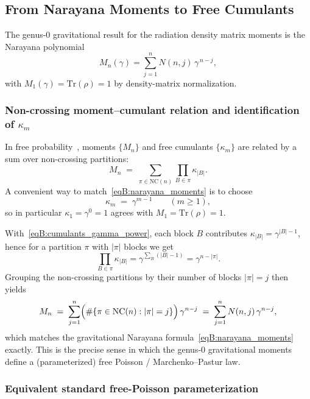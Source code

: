 \documentclass[11pt,letterpaper]{article}
\theoremstyle{plain}
\theoremstyle{definition}
\theoremstyle{remark}
\begin{document}
\subsection{From Narayana Moments to Free Cumulants}
\label{subsecB:narayana_to_cumulants}

The genus-0 gravitational result for the radiation density matrix moments is the Narayana polynomial
\begin{equation}
\label{eqB:narayana_moments}
M_n(\gamma)=\sum_{j=1}^{n} N(n,j)\,\gamma^{\,n-j},
\end{equation}
with $M_1(\gamma)=\mathrm{Tr}(\rho)=1$ by density-matrix normalization.

\subsubsection*{Non-crossing moment--cumulant relation and identification of $\kappa_m$}

In free probability~\cite{nicaspeicher2006,voiculescu1991}, moments $\{M_n\}$ and free cumulants $\{\kappa_m\}$ are related by a sum over non-crossing partitions:
\begin{equation}
\label{eqB:moment_cumulant}
M_n \;=\; \sum_{\pi \in \mathrm{NC}(n)} \prod_{B\in\pi} \kappa_{|B|}.
\end{equation}
A convenient way to match~\eqref{eqB:narayana_moments} is to choose
\begin{equation}
\label{eqB:cumulants_gamma_power}
\kappa_m \;=\; \gamma^{m-1}\qquad (m\ge 1),
\end{equation}
so in particular $\kappa_1=\gamma^{0}=1$ agrees with $M_1=\mathrm{Tr}(\rho)=1$.

With~\eqref{eqB:cumulants_gamma_power}, each block $B$ contributes $\kappa_{|B|}=\gamma^{|B|-1}$, hence for a partition $\pi$ with $|\pi|$ blocks we get
\[
\prod_{B\in\pi}\kappa_{|B|}=\gamma^{\sum_B(|B|-1)}=\gamma^{n-|\pi|}.
\]
Grouping the non-crossing partitions by their number of blocks $|\pi|=j$ then yields
\[
M_n \;=\; \sum_{j=1}^{n} \Bigl(\#\{\pi\in\mathrm{NC}(n):|\pi|=j\}\Bigr)\,\gamma^{n-j}
\;=\;\sum_{j=1}^{n} N(n,j)\,\gamma^{n-j},
\]
which matches the gravitational Narayana formula~\eqref{eqB:narayana_moments} exactly. This is the precise sense in which the genus-0 gravitational moments define a (parameterized) free Poisson / Marchenko--Pastur law.

\subsubsection*{Equivalent standard free-Poisson parameterization}
\end{document}
